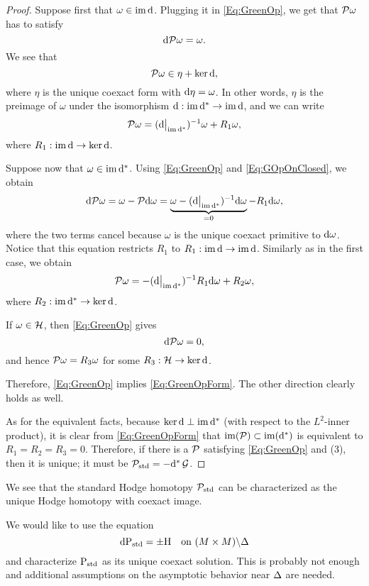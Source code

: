 \documentclass[\MainFolder/Text.tex]{subfiles}
\begin{document}
\begin{proof}
Suppose first that $\omega \in \operatorname{im}\mathrm{d}$. Plugging it in \eqref{Eq:GreenOp}, we get that $\mathcal{P} \omega$ has to satisfy
$$ \mathrm{d} \mathcal{P} \omega = \omega. $$
We see that 
$$ \mathcal{P}\omega \in \eta + \operatorname{ker} \mathrm{d}, $$
where $\eta$ is the unique coexact form with $\mathrm{d} \eta = \omega$. In other words, $\eta$ is the preimage of $\omega$ under the isomorphism $\mathrm{d}: \operatorname{im} \mathrm{d}^* \rightarrow \operatorname{im} \mathrm{d}$, and we can write 
\begin{equation}\label{Eq:GOpOnClosed}
\Htp \omega = (\Restr{\Dd}{\Im \CoDd})^{-1} \omega + R_1 \omega,
\end{equation}
where $R_1: \operatorname{im} \mathrm{d} \rightarrow \operatorname{ker} \mathrm{d}$.

Suppose now that $\omega \in \operatorname{im}\mathrm{d}^*$. Using \eqref{Eq:GreenOp} and \eqref{Eq:GOpOnClosed}, we obtain
$$ \Dd \Htp \omega = \omega - \Htp \Dd \omega = \underbrace{\omega - (\Restr{\Dd}{\Im \CoDd})^{-1} \Dd \omega}_{=0}- R_1 \Dd \omega, $$
where the two terms cancel because $\omega$ is the unique coexact primitive to $\mathrm{d} \omega$. Notice that this equation restricts $R_1$ to $R_1: \operatorname{im} \mathrm{d} \rightarrow \operatorname{im} \mathrm{d}$. Similarly as in the first case, we obtain
$$ \Htp \omega = - (\Restr{\Dd}{\Im\CoDd})^{-1} R_1 \Dd \omega + R_2 \omega, $$
where $R_2: \operatorname{im}\mathrm{d}^* \rightarrow \operatorname{ker} \mathrm{d}$.

If $\omega\in \mathcal{H}$, then \eqref{Eq:GreenOp} gives
$$ \mathrm{d} \mathcal{P} \omega = 0, $$
and hence $\mathcal{P} \omega = R_3 \omega$ for some $R_3: \mathcal{H} \rightarrow \operatorname{ker} \mathrm{d}$.

Therefore, \eqref{Eq:GreenOp} implies \eqref{Eq:GreenOpForm}. The other direction clearly holds as well.



As for the equivalent facts, because $\operatorname{ker} \mathrm{d} \perp \operatorname{im} \mathrm{d}^*$ (with respect to the $L^2$-inner product), it is clear from \eqref{Eq:GreenOpForm} that $\operatorname{im}(\mathcal{P})\subset \operatorname{im}(\mathrm{d}^*)$ is equivalent to $R_1 = R_2 = R_3 = 0$. Therefore, if there is a $\mathcal{P}$ satisfying \eqref{Eq:GreenOp} and (3), then it is unique; it must be $\mathcal{P}_{\mathrm{std}} = -\mathrm{d}^*\operatorname{\mathcal{G}}$.  
\end{proof}

We see that the standard Hodge homotopy $\mathcal{P}_{\mathrm{std}}$ can be characterized as the unique Hodge homotopy with coexact image.

We would like to use the equation
\begin{equation}\label{Eq:DFGDFG}
\mathrm{d} \mathrm{P}_{\mathrm{std}} = \pm \mathrm{H} \quad\text{on }(M\times M)\backslash\Delta 
\end{equation}
and characterize $\mathrm{P}_{\mathrm{std}}$ as its unique coexact solution. This is probably not enough and additional assumptions on the asymptotic behavior near $\Delta$ are needed.
\end{document}
